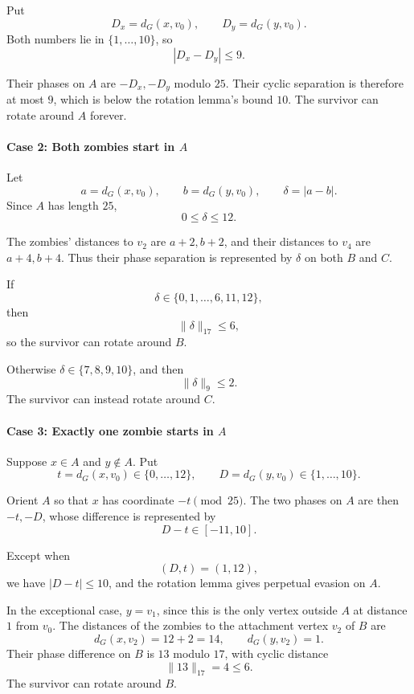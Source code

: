 \documentclass[
  11pt,
  a4paper,
]{article}
\begin{document}
Put \[
D_x=d_G(x,v_0),\qquad D_y=d_G(y,v_0).
\] Both numbers lie in \(\{1,\ldots,10\}\), so \[
|D_x-D_y|\le9.
\]

Their phases on \(A\) are \(-D_x,-D_y\) modulo \(25\). Their cyclic
separation is therefore at most \(9\), which is below the rotation
lemma's bound \(10\). The survivor can rotate around \(A\) forever.

\paragraph{\texorpdfstring{Case 2: Both zombies start in
\(A\)}{Case 2: Both zombies start in A}}\label{case-2-both-zombies-start-in-a}

Let \[
a=d_G(x,v_0),\qquad b=d_G(y,v_0),\qquad
\delta=|a-b|.
\] Since \(A\) has length \(25\), \[
0\le\delta\le12.
\]

The zombies' distances to \(v_2\) are \(a+2,b+2\), and their distances
to \(v_4\) are \(a+4,b+4\). Thus their phase separation is represented
by \(\delta\) on both \(B\) and \(C\).

If \[
\delta\in\{0,1,\ldots,6,11,12\},
\] then \[
\|\delta\|_{17}\le6,
\] so the survivor can rotate around \(B\).

Otherwise \(\delta\in\{7,8,9,10\}\), and then \[
\|\delta\|_9\le2.
\] The survivor can instead rotate around \(C\).

\paragraph{\texorpdfstring{Case 3: Exactly one zombie starts in
\(A\)}{Case 3: Exactly one zombie starts in A}}\label{case-3-exactly-one-zombie-starts-in-a}

Suppose \(x\in A\) and \(y\notin A\). Put \[
t=d_G(x,v_0)\in\{0,\ldots,12\},
\qquad
D=d_G(y,v_0)\in\{1,\ldots,10\}.
\]

Orient \(A\) so that \(x\) has coordinate \(-t\pmod{25}\). The two
phases on \(A\) are then \(-t,-D\), whose difference is represented by
\[
D-t\in[-11,10].
\]

Except when \[
(D,t)=(1,12),
\] we have \(|D-t|\le10\), and the rotation lemma gives perpetual
evasion on \(A\).

In the exceptional case, \(y=v_1\), since this is the only vertex
outside \(A\) at distance \(1\) from \(v_0\). The distances of the
zombies to the attachment vertex \(v_2\) of \(B\) are \[
d_G(x,v_2)=12+2=14,
\qquad
d_G(y,v_2)=1.
\] Their phase difference on \(B\) is \(13\) modulo \(17\), with cyclic
distance \[
\|13\|_{17}=4\le6.
\] The survivor can rotate around \(B\).
\end{document}
